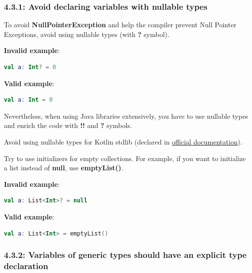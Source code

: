 \subsubsection*{\textbf{4.3.1: Avoid declaring variables with nullable types}}
\leavevmode\newline

\label{sec:4.3.1}

To avoid \textbf{NullPointerException} and help the compiler prevent Null Pointer Exceptions, avoid using nullable types (with \textbf{?} symbol).



\textbf{Invalid example}:

\begin{lstlisting}[language=Kotlin]
val a: Int? = 0
\end{lstlisting}


\textbf{Valid example}:

\begin{lstlisting}[language=Kotlin]
val a: Int = 0
\end{lstlisting}


Nevertheless, when using Java libraries extensively, you have to use nullable types and enrich the code with \textbf{!!} and \textbf{?} symbols.

Avoid using nullable types for Kotlin stdlib (declared in \href{https://kotlinlang.org/api/latest/jvm/stdlib/kotlin.collections/}{official documentation}). 

Try to use initializers for empty collections. For example, if you want to initialize a list instead of \textbf{null}, use \textbf{emptyList()}.



\textbf{Invalid example}:

\begin{lstlisting}[language=Kotlin]
val a: List<Int>? = null 
\end{lstlisting}


\textbf{Valid example}:

\begin{lstlisting}[language=Kotlin]
val a: List<Int> = emptyList()
\end{lstlisting}


\subsubsection*{\textbf{4.3.2: Variables of generic types should have an explicit type declaration}}
\leavevmode\newline

